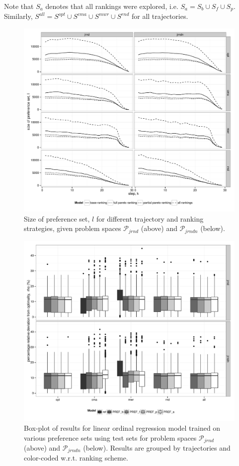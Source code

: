 \documentclass{svjour3}                     %
\begin{document}
Note that $S_{a}$ denotes that all rankings were explored, i.e. $S_{a}=S_b\cup S_f\cup S_p$. Similarly, $S^{all}=S^{opt}\cup S^{cma}\cup S^{mwr} \cup S^{rnd}$ for all trajectories.


\begin{figure} \centering
\includegraphics[width=\textwidth]{numTrainingData}
\caption{Size of preference set, $l$ for different trajectory and ranking strategies, given problem spaces $\mathcal{P}_{jrnd}$ (above) and $\mathcal{P}_{jrndn}$ (below).}
\label{fig:sizeofprefset}
\end{figure}


\begin{figure}\flushright \hfill
\includegraphics[width=\textwidth]{boxplot} 
\caption{Box-plot of results for linear ordinal regression model trained on various preference sets using test sets for problem spaces $\mathcal{P}_{jrnd}$ (above) and $\mathcal{P}_{jrndn}$ (below). Results are grouped by trajectories and color-coded w.r.t. ranking scheme. }
\label{fig:results}
\end{figure}
 
\end{document}

